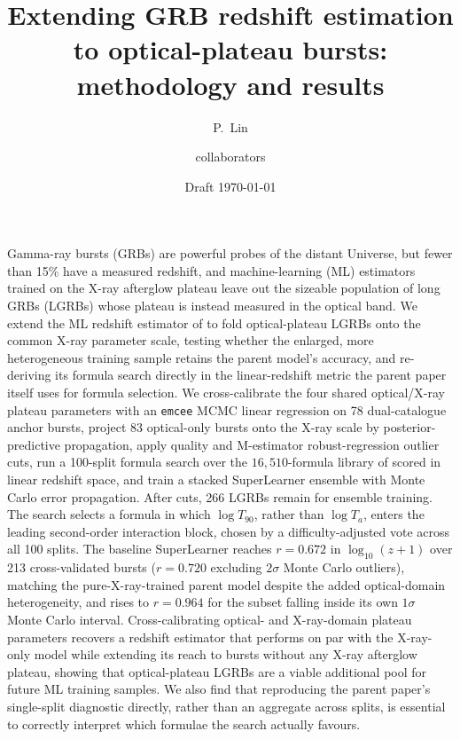 \documentclass{aa}
\newcommand{\Ta}{T_a}
\newcommand{\logz}{\log_{10}(z+1)}
\begin{document}
\title{Extending GRB redshift estimation to optical-plateau bursts:
       methodology and results}
\author{P.~Lin \and collaborators}
\date{Draft \today}

\abstract
{Gamma-ray bursts (GRBs) are powerful probes of the distant Universe, but fewer
 than 15\% have a measured redshift, and machine-learning (ML) estimators
 trained on the X-ray afterglow plateau leave out the sizeable population of
 long GRBs (LGRBs) whose plateau is instead measured in the optical band.}
{We extend the ML redshift estimator of \citet{narendra2025} to fold
 optical-plateau LGRBs onto the common X-ray parameter scale, testing whether
 the enlarged, more heterogeneous training sample retains the parent model's
 accuracy, and re-deriving its formula search directly in the linear-redshift
 metric the parent paper itself uses for formula selection.}
{We cross-calibrate the four shared optical/X-ray plateau parameters with an
 \texttt{emcee} MCMC linear regression on 78 dual-catalogue anchor bursts,
 project 83 optical-only bursts onto the X-ray scale by posterior-predictive
 propagation, apply quality and M-estimator robust-regression outlier cuts,
 run a 100-split formula search over the $16{,}510$-formula library of
 \citet{narendra2025} scored in linear redshift space, and train a stacked
 SuperLearner ensemble with Monte Carlo error propagation.}
{After cuts, 266 LGRBs remain for ensemble training. The search selects a
 formula in which $\log T_{90}$, rather than $\log \Ta$, enters the leading
 second-order interaction block, chosen by a difficulty-adjusted vote across
 all 100 splits. The baseline SuperLearner reaches $r=0.672$ in $\logz$ over
 213 cross-validated bursts ($r=0.720$ excluding $2\sigma$ Monte Carlo
 outliers), matching the pure-X-ray-trained parent model despite the added
 optical-domain heterogeneity, and rises to $r=0.964$ for the subset falling
 inside its own $1\sigma$ Monte Carlo interval.}
{Cross-calibrating optical- and X-ray-domain plateau parameters recovers a
 redshift estimator that performs on par with the X-ray-only model while
 extending its reach to bursts without any X-ray afterglow plateau, showing
 that optical-plateau LGRBs are a viable additional pool for future ML
 training samples. We also find that reproducing the parent paper's
 single-split diagnostic directly, rather than an aggregate across splits, is
 essential to correctly interpret which formulae the search actually favours.}
\end{document}
